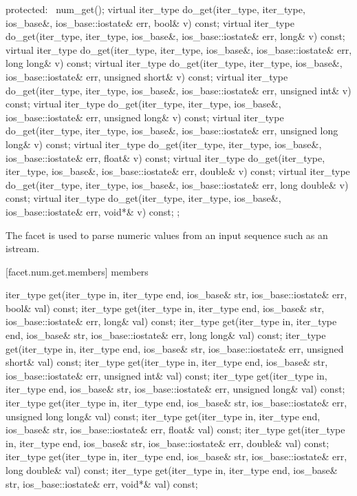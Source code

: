\begin{codeblock}
{{  protected:
    ~num_get();
    virtual iter_type do_get(iter_type, iter_type, ios_base&,
                             ios_base::iostate& err, bool& v) const;
    virtual iter_type do_get(iter_type, iter_type, ios_base&,
                             ios_base::iostate& err, long& v) const;
    virtual iter_type do_get(iter_type, iter_type, ios_base&,
                             ios_base::iostate& err, long long& v) const;
    virtual iter_type do_get(iter_type, iter_type, ios_base&,
                             ios_base::iostate& err, unsigned short& v) const;
    virtual iter_type do_get(iter_type, iter_type, ios_base&,
                             ios_base::iostate& err, unsigned int& v) const;
    virtual iter_type do_get(iter_type, iter_type, ios_base&,
                             ios_base::iostate& err, unsigned long& v) const;
    virtual iter_type do_get(iter_type, iter_type, ios_base&,
                             ios_base::iostate& err, unsigned long long& v) const;
    virtual iter_type do_get(iter_type, iter_type, ios_base&,
                             ios_base::iostate& err, float& v) const;
    virtual iter_type do_get(iter_type, iter_type, ios_base&,
                             ios_base::iostate& err, double& v) const;
    virtual iter_type do_get(iter_type, iter_type, ios_base&,
                             ios_base::iostate& err, long double& v) const;
    virtual iter_type do_get(iter_type, iter_type, ios_base&,
                             ios_base::iostate& err, void*& v) const;
  };
}
\end{codeblock}
 
\pnum
The facet
is used to parse numeric values from an input sequence such as an istream.

[facet.num.get.members]{ members}

%
\begin{itemdecl}
iter_type get(iter_type in, iter_type end, ios_base& str,
  ios_base::iostate& err, bool& val) const;
iter_type get(iter_type in, iter_type end, ios_base& str,
  ios_base::iostate& err, long& val) const;
iter_type get(iter_type in, iter_type end, ios_base& str,
  ios_base::iostate& err, long long& val) const;
iter_type get(iter_type in, iter_type end, ios_base& str,
  ios_base::iostate& err, unsigned short& val) const;
iter_type get(iter_type in, iter_type end, ios_base& str,
  ios_base::iostate& err, unsigned int& val) const;
iter_type get(iter_type in, iter_type end, ios_base& str,
  ios_base::iostate& err, unsigned long& val) const;
iter_type get(iter_type in, iter_type end, ios_base& str,
  ios_base::iostate& err, unsigned long long& val) const;
iter_type get(iter_type in, iter_type end, ios_base& str,
  ios_base::iostate& err, float& val) const;
iter_type get(iter_type in, iter_type end, ios_base& str,
  ios_base::iostate& err, double& val) const;
iter_type get(iter_type in, iter_type end, ios_base& str,
  ios_base::iostate& err, long double& val) const;
iter_type get(iter_type in, iter_type end, ios_base& str,
  ios_base::iostate& err, void*& val) const;
\end{itemdecl}

